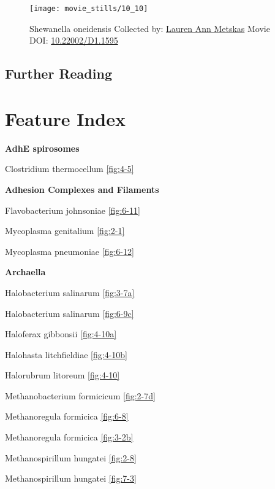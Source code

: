 \documentclass[]{tufte-book}
\begin{document}
\begin{figure}
\texttt{[image: movie\_stills/10\_10]} \caption[Shewanella oneidensis Collected by:
\protect\hyperlink{lauren_ann_metskas}{Lauren Ann Metskas} Movie DOI:
\href{https://doi.org/10.22002/D1.1595}{10.22002/D1.1595}]{Shewanella oneidensis Collected by:
\protect\hyperlink{lauren_ann_metskas}{Lauren Ann Metskas} Movie DOI:
\href{https://doi.org/10.22002/D1.1595}{10.22002/D1.1595}}\label{fig:10-10}
\end{figure}

\section{Further Reading}\label{further-reading-9}

\citep{keen2015}

\citep{prangishvili2017}

\citep{rohwer2014}

\appendix


\chapter{Feature Index}\label{feature-index}

\textbf{AdhE spirosomes}

Clostridium thermocellum \ref{fig:4-5}

\textbf{Adhesion Complexes and Filaments}

Flavobacterium johnsoniae \ref{fig:6-11}

Mycoplasma genitalium \ref{fig:2-1}

Mycoplasma pneumoniae \ref{fig:6-12}

\textbf{Archaella}

Halobacterium salinarum \ref{fig:3-7a}

Halobacterium salinarum \ref{fig:6-9c}

Haloferax gibbonsii \ref{fig:4-10a}

Halohasta litchfieldiae \ref{fig:4-10b}

Halorubrum litoreum \ref{fig:4-10}

Methanobacterium formicicum \ref{fig:2-7d}

Methanoregula formicica \ref{fig:6-8}

Methanoregula formicica \ref{fig:3-2b}

Methanospirillum hungatei \ref{fig:2-8}

Methanospirillum hungatei \ref{fig:7-3}
\end{document}
